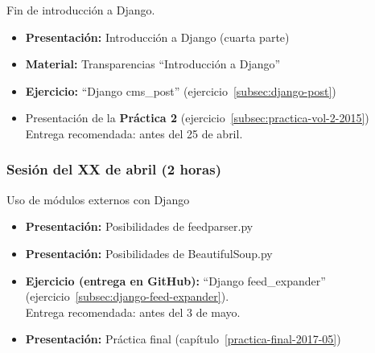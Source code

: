 \documentclass[a4paper,12pt]{article}
\begin{document}
Fin de introducción a Django. %

\begin{itemize}
    \item \textbf{Presentación:} Introducción a Django (cuarta parte)
    \item \textbf{Material:} Transparencias ``Introducción a Django''
    \item \textbf{Ejercicio:} ``Django cms\_post'' (ejercicio~\ref{subsec:django-post})
     \item Presentación de la \textbf{Práctica 2} (ejercicio~\ref{subsec:practica-vol-2-2015}) \\
  Entrega recomendada: antes del 25 de abril.
\end{itemize}

\subsubsection{Sesión del XX de abril (2 horas)}

Uso de módulos externos con Django

\begin{itemize}
  \item \textbf{Presentación:} Posibilidades de feedparser.py
  \item \textbf{Presentación:} Posibilidades de BeautifulSoup.py
  \item \textbf{Ejercicio (entrega en GitHub):} ``Django feed\_expander'' (ejercicio~\ref{subsec:django-feed-expander}). \\
  Entrega recomendada: antes del 3 de mayo.
  \item \textbf{Presentación:} Práctica final (capítulo~\ref{practica-final-2017-05})
\end{itemize}


\end{document}
